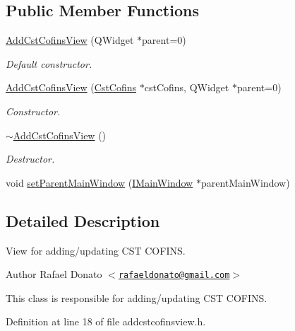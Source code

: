 \subsection*{\-Public \-Member \-Functions}
\begin{DoxyCompactItemize}
\item 
\hyperlink{class_add_cst_cofins_view_a0366ccbd9d13e1ae2aa7f31dfe47e666}{\-Add\-Cst\-Cofins\-View} (\-Q\-Widget $\ast$parent=0)
\begin{DoxyCompactList}\small\item\em \-Default constructor. \end{DoxyCompactList}\item 
\hyperlink{class_add_cst_cofins_view_a2cd86d7cca9d177bc8eef260820acffc}{\-Add\-Cst\-Cofins\-View} (\hyperlink{class_cst_cofins}{\-Cst\-Cofins} $\ast$cst\-Cofins, \-Q\-Widget $\ast$parent=0)
\begin{DoxyCompactList}\small\item\em \-Constructor. \end{DoxyCompactList}\item 
\hyperlink{class_add_cst_cofins_view_ab5c0c0ba3f472e8294083f66fb61fdcf}{$\sim$\-Add\-Cst\-Cofins\-View} ()
\begin{DoxyCompactList}\small\item\em \-Destructor. \end{DoxyCompactList}\item 
void \hyperlink{class_add_cst_cofins_view_a960f92ed0bcf8ccd9b9bea3c91059355}{set\-Parent\-Main\-Window} (\hyperlink{class_i_main_window}{\-I\-Main\-Window} $\ast$parent\-Main\-Window)
\end{DoxyCompactItemize}


\subsection{\-Detailed \-Description}
\-View for adding/updating \-C\-S\-T \-C\-O\-F\-I\-N\-S. 

\begin{DoxyAuthor}{\-Author}
\-Rafael \-Donato $<$\href{mailto:rafaeldonato@gmail.com}{\tt rafaeldonato@gmail.\-com}$>$
\end{DoxyAuthor}
\-This class is responsible for adding/updating \-C\-S\-T \-C\-O\-F\-I\-N\-S. 

\-Definition at line 18 of file addcstcofinsview.\-h.



